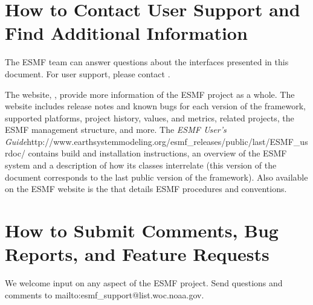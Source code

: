 \section{How to Contact User Support and Find Additional Information}
\label{sec:Support}
The ESMF team can answer questions about the interfaces presented in this 
document.  For user support, please contact 
.  

The website, , provide more information of the ESMF project as a whole.
The website includes release notes and known bugs for each version of the
framework, supported platforms, project history, values, and metrics, related projects,
the ESMF management structure, and more.  The \htmladdnormallink
{{\it ESMF User's Guide}}{http://www.earthsystemmodeling.org/esmf\_releases/public/last/ESMF\_usrdoc/} contains build and installation instructions, an overview of the ESMF system and a description of 
how its classes interrelate (this version of the document corresponds to the last public version of the framework).  Also available on the ESMF website is the 
that details ESMF procedures and conventions.  
 
\section{How to Submit Comments, Bug Reports, and Feature Requests}
\label{sec:Submission}
\begin{sloppypar}
We welcome input on any aspect of the ESMF project.  Send
questions and comments to 
{mailto:esmf\_support@list.woc.noaa.gov}.
\end{sloppypar}






